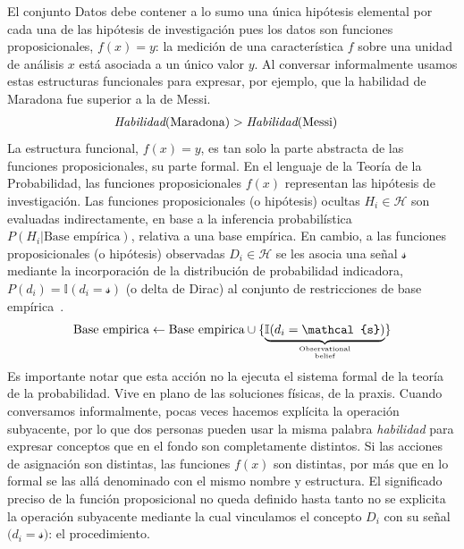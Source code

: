 \documentclass[a4paper,11pt]{book}
\newcommand\hfrac[2]{\genfrac{}{}{0pt}{}{#1}{#2}} %
\theoremstyle{definition}
\begin{document}
El conjunto Datos debe contener a lo sumo una \'unica hip\'otesis elemental por cada una de las hip\'otesis de investigaci\'on pues los datos son funciones proposicionales, $f(x)=y$: la medici\'on de una caracter\'istica $f$ sobre una unidad de an\'alisis $x$ est\'a asociada a un \'unico valor $y$.
%
Al conversar informalmente usamos estas estructuras funcionales para expresar, por ejemplo, que la habilidad de Maradona fue superior a la de Messi.
%
\begin{align*}\label{eq:opiniones}
& \emph{Habilidad}(\text{Maradona}) > \emph{Habilidad}(\text{Messi})
\end{align*}
%
La estructura funcional, $f(x)=y$, es tan solo la parte abstracta de las funciones proposicionales, su parte formal.
%
En el lenguaje de la Teor\'ia de la Probabilidad, las funciones proposicionales $f(x)$ representan las hip\'otesis de investigaci\'on.
%
Las funciones proposicionales (o hip\'otesis) ocultas $H_i \in \mathcal{H}$ son evaluadas indirectamente, en base a la inferencia probabil\'istica $P(H_i|\text{Base emp\'irica})$, relativa a una base emp\'irica.
%
En cambio, a las funciones proposicionales (o hip\'otesis) observadas $D_i \in \mathcal{H}$ se les asocia una se\~nal $\mathcal{s}$ mediante la incorporaci\'on de la distribuci\'on de probabilidad indicadora, $P(d_i) = \mathbb{I}(d_i = \mathcal{s})$ (o delta de Dirac) al conjunto de restricciones de base emp\'irica~\cite{minka2008-gates, winn2012-causality}.
%
\begin{equation}
\text{Base empirica} \leftarrow \text{Base empirica} \cup \{ \underbrace{\mathbb{I}(d_i = \mathcal{s})}_{\hfrac{\text{Observational}}{\text{belief}} }  \}
\end{equation}
%
Es importante notar que esta acci\'on no la ejecuta el sistema formal de la teor\'ia de la probabilidad.
%
Vive en plano de las soluciones f\'isicas, de la praxis.
%
Cuando conversamos informalmente, pocas veces hacemos expl\'icita la operaci\'on subyacente, por lo que dos personas pueden usar la misma palabra \emph{habilidad} para expresar conceptos que en el fondo son completamente distintos.
%
Si las acciones de asignaci\'on son distintas, las funciones $f(x)$ son distintas, por m\'as que en lo formal se las all\'a denominado con el mismo nombre y estructura.
%
El significado preciso de la funci\'on proposicional no queda definido hasta tanto no se explicita la operaci\'on subyacente mediante la cual vinculamos el concepto $D_i$ con su se\~nal $\mathbb(d_i = \mathcal{s})$: el procedimiento.
\end{document}
